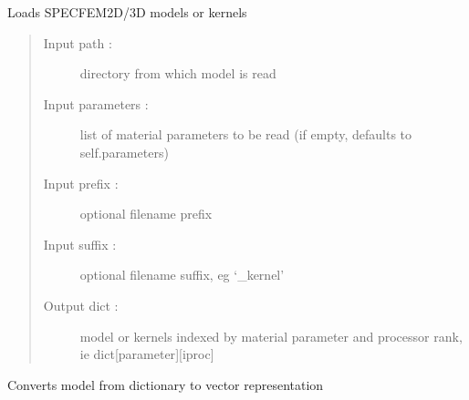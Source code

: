 \documentclass[letterpaper,10pt,english]{sphinxmanual}
\begin{document}
\begin{fulllineitems}
\begin{fulllineitems}
\end{fulllineitems}


\begin{fulllineitems}
\label{\detokenize{ref/seisflows.solver:seisflows.solver.base.base.kernel_databases}}
\end{fulllineitems}


\begin{fulllineitems}
\label{\detokenize{ref/seisflows.solver:seisflows.solver.base.base.load}}
Loads SPECFEM2D/3D models or kernels
\begin{quote}\begin{description}
\item[{Input path :}] \leavevmode
directory from which model is read

\item[{Input parameters :}] \leavevmode
list of material parameters to be read
(if empty, defaults to self.parameters)

\item[{Input prefix :}] \leavevmode
optional filename prefix

\item[{Input suffix :}] \leavevmode
optional filename suffix, eg ‘\_kernel’

\item[{Output dict :}] \leavevmode
model or kernels indexed by material parameter
and processor rank, ie dict{[}parameter{]}{[}iproc{]}

\end{description}\end{quote}

\end{fulllineitems}


\begin{fulllineitems}
\label{\detokenize{ref/seisflows.solver:seisflows.solver.base.base.merge}}
Converts model from dictionary to vector representation


\end{fulllineitems}
\end{fulllineitems}
\end{document}
